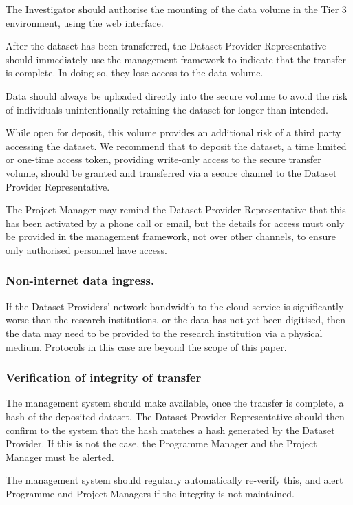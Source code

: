 \documentclass[10pt,a4paper,twocolumn]{article}
\begin{document}
The Investigator should authorise the mounting of the data volume in the Tier 3 environment, using the web interface.

After the dataset has been transferred, the Dataset Provider Representative should immediately use the management framework to indicate that the transfer is complete. In doing so, they lose access to the data volume. 

Data should always be uploaded directly into the secure volume
to avoid the risk of individuals unintentionally retaining the dataset for longer than intended.

While open for deposit, this volume provides an additional risk of a third party accessing the dataset. We recommend that to deposit the dataset, a time limited or one-time access token, providing write-only access to the secure transfer volume, should be granted and transferred via a secure channel to the Dataset Provider Representative.

The Project Manager may remind the Dataset Provider Representative that this has been activated by a phone call or email, but the details for access must only be provided in the management framework, not over other channels, to ensure only authorised personnel have access.

\subsubsection{Non-internet data ingress.}

If the Dataset Providers' network bandwidth to the cloud service is significantly worse than the research institutions, or the data has not yet been digitised,
then the data may need to be provided to the research institution via a physical medium. Protocols in this case are beyond the scope of this paper.

\subsubsection{Verification of integrity of transfer}

The management system should make available, once the transfer is complete, a hash of the deposited dataset. The Dataset Provider Representative 
should then confirm to the system that the hash matches a hash generated by the Dataset Provider. If this is not the case, the Programme Manager and the Project Manager must be alerted. 

The management system should regularly automatically re-verify this, and alert Programme and Project Managers if the integrity is not maintained.
\end{document}
